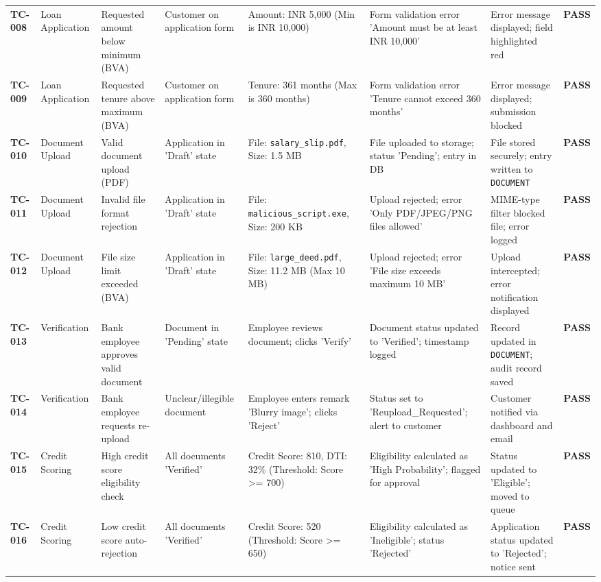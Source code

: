 \documentclass[12pt,a4paper,oneside]{report}
\begin{document}
\begin{table}[htbp]
\begin{tabularx}{\textwidth}{p{2.5cm} X X X X X X X}
\textbf{TC-008} & Loan Application & Requested amount below minimum (BVA) & Customer on application form & Amount: INR 5,000 (Min is INR 10,000) & Form validation error 'Amount must be at least INR 10,000' & Error message displayed; field highlighted red & \textbf{PASS} \\
\textbf{TC-009} & Loan Application & Requested tenure above maximum (BVA) & Customer on application form & Tenure: 361 months (Max is 360 months) & Form validation error 'Tenure cannot exceed 360 months' & Error message displayed; submission blocked & \textbf{PASS} \\
\textbf{TC-010} & Document Upload & Valid document upload (PDF) & Application in 'Draft' state & File: \texttt{salary\_slip.pdf}, Size: 1.5 MB & File uploaded to storage; status 'Pending'; entry in DB & File stored securely; entry written to \texttt{DOCUMENT} & \textbf{PASS} \\
\textbf{TC-011} & Document Upload & Invalid file format rejection & Application in 'Draft' state & File: \texttt{malicious\_script.exe}, Size: 200 KB & Upload rejected; error 'Only PDF/JPEG/PNG files allowed' & MIME-type filter blocked file; error logged & \textbf{PASS} \\
\textbf{TC-012} & Document Upload & File size limit exceeded (BVA) & Application in 'Draft' state & File: \texttt{large\_deed.pdf}, Size: 11.2 MB (Max 10 MB) & Upload rejected; error 'File size exceeds maximum 10 MB' & Upload intercepted; error notification displayed & \textbf{PASS} \\
\textbf{TC-013} & Verification & Bank employee approves valid document & Document in 'Pending' state & Employee reviews document; clicks 'Verify' & Document status updated to 'Verified'; timestamp logged & Record updated in \texttt{DOCUMENT}; audit record saved & \textbf{PASS} \\
\textbf{TC-014} & Verification & Bank employee requests re-upload & Unclear/illegible document & Employee enters remark 'Blurry image'; clicks 'Reject' & Status set to 'Reupload\_Requested'; alert to customer & Customer notified via dashboard and email & \textbf{PASS} \\
\textbf{TC-015} & Credit Scoring & High credit score eligibility check & All documents 'Verified' & Credit Score: 810, DTI: 32\% (Threshold: Score >= 700) & Eligibility calculated as 'High Probability'; flagged for approval & Status updated to 'Eligible'; moved to queue & \textbf{PASS} \\
\textbf{TC-016} & Credit Scoring & Low credit score auto-rejection & All documents 'Verified' & Credit Score: 520 (Threshold: Score >= 650) & Eligibility calculated as 'Ineligible'; status 'Rejected' & Application status updated to 'Rejected'; notice sent & \textbf{PASS} \\

\end{tabularx}
\end{table}
\end{document}
